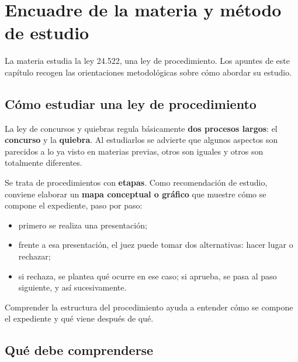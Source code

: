 \documentclass[12pt,oneside]{book}
\begin{document}
\tableofcontents


\chapter[Encuadre de la materia]{Encuadre de la materia y método de estudio}

La materia estudia la ley 24.522, una ley de procedimiento. Los apuntes de este capítulo recogen las orientaciones metodológicas sobre cómo abordar su estudio.

\section{Cómo estudiar una ley de procedimiento}

La ley de concursos y quiebras regula básicamente \textbf{dos procesos largos}: el \textbf{concurso} y la \textbf{quiebra}. Al estudiarlos se advierte que algunos aspectos son parecidos a lo ya visto en materias previas, otros son iguales y otros son totalmente diferentes.

Se trata de procedimientos con \textbf{etapas}. Como recomendación de estudio, conviene elaborar un \textbf{mapa conceptual o gráfico} que muestre cómo se compone el expediente, paso por paso:
\begin{itemize}
    \item primero se realiza una presentación;
    \item frente a esa presentación, el juez puede tomar dos alternativas: hacer lugar o rechazar;
    \item si rechaza, se plantea qué ocurre en ese caso; si aprueba, se pasa al paso siguiente, y así sucesivamente.
\end{itemize}

Comprender la estructura del procedimiento ayuda a entender cómo se compone el expediente y qué viene después de qué.

\section{Qué debe comprenderse}
\end{document}
